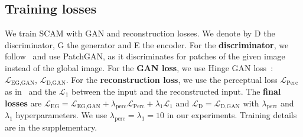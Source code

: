 \documentclass[runningheads]{llncs}
\makeatletter
\newcommand{\mname}{SCAM\@\xspace}
\makeatother
\begin{document}
 
\subsection{Training losses}
We train \mname with GAN and reconstruction losses. We denote by D the discriminator, G the generator and E the encoder.
For the \textbf{ discriminator}, we follow~\cite{isola2018imagetoimage,wang2018pix2pixHD,wang2018pix2pixHD,park2019semantic} and use PatchGAN, as it discriminates for patches of the given image instead of the global image. 
For the \textbf{GAN loss}, we use Hinge GAN loss~\cite{lim2017geometric}: $\mathcal{L}_{\text{EG,GAN}}$, $\mathcal{L}_{\text{D,GAN}}$. 
For the \textbf{reconstruction loss}, we use the perceptual loss $\mathcal{L}_{\text{Perc}}$ as in~\cite{Zhu_2020} and the $\mathcal{L}_1$  between the input and the reconstructed input. 
The \textbf{final losses} are $\mathcal{L}_{\text{EG}} =  \mathcal{L}_{\text{EG,GAN}} + \lambda_{\text{perc}}\mathcal{L}_{\text{Perc}} + \lambda_{1}\mathcal{L}_{1}$ and $\mathcal{L}_{\text{D}} {=} \mathcal{L}_{\text{D,GAN}} $ with $\lambda_{\text{perc}}$ and $\lambda_{1}$ hyperparameters. 
We use $\lambda_{\text{perc}}{=}\lambda_{1}{=}10$ in our experiments. Training details are in the supplementary.
\end{document}
